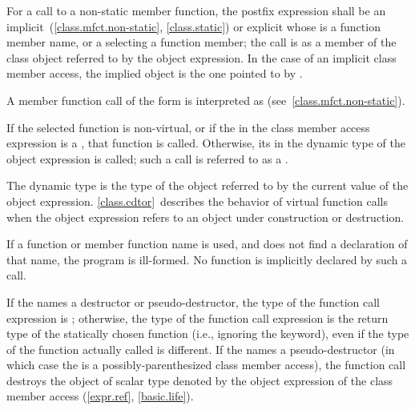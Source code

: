 \pnum
For a call to a non-static member function,
the postfix expression shall be an
implicit~(\ref{class.mfct.non-static}, \ref{class.static}) or explicit
 whose  is a
function member name, or a  selecting a function member; the call is as a member of
the class object referred to by the
object expression. In the case of an implicit class
member access, the implied object is the one pointed to by .
\begin{note}
A member function call of the form  is interpreted as
 (see~\ref{class.mfct.non-static}).
\end{note}

\pnum
If the selected
function is non-virtual, or if the  in the class
member access expression is a , that function is
called. Otherwise, its  in the dynamic type
of the object expression is called; such a call is referred to as a
.
\begin{note}
The dynamic type is the type of the object referred to by the
current value of the object expression. \ref{class.cdtor}~describes the
behavior of virtual function calls when the object expression
refers to
an object under construction or destruction.
\end{note}

\pnum
\begin{note}
If a function or member function name is used, and  does not find a declaration of that name,
the program is ill-formed. No function is implicitly declared by such a
call.
\end{note}

\pnum
If the  names
a destructor or pseudo-destructor,
the type of the function call expression is ; otherwise, the
type of the function call expression is the return type of the
statically chosen function (i.e., ignoring the  keyword),
even if the type of the function actually called is different.
%
If the  names a pseudo-destructor
(in which case the 
is a possibly-parenthesized class member access),
the function call destroys
the object of scalar type
denoted by the object expression
of the class member access (\ref{expr.ref}, \ref{basic.life}).

